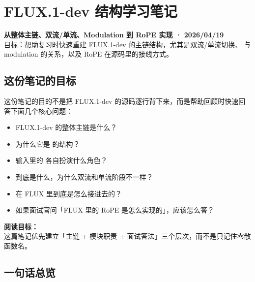 
\section{FLUX.1-dev 结构学习笔记}

\begin{conceptbox}
\textbf{从整体主链、双流/单流、Modulation 到 RoPE 实现 · 2026/04/19}\\
目标：帮助复习时快速重建 FLUX.1-dev 的主链结构，尤其是双流/单流切换、 与 modulation 的关系，以及 RoPE 在源码里的接线方式。
\end{conceptbox}

\subsection{这份笔记的目标}

这份笔记的目的不是把 FLUX.1-dev 的源码逐行背下来，而是帮助回顾时快速回答下面几个核心问题：

\begin{itemize}[leftmargin=1.5em]
  \item FLUX.1-dev 的整体主链是什么？
  \item 为什么它是  的结构？
  \item 输入里的  各自扮演什么角色？
  \item {} 到底是什么，为什么双流和单流阶段不一样？
  \item {} 在 FLUX 里到底是怎么接进去的？
  \item 如果面试官问「FLUX 里的 RoPE 是怎么实现的」，应该怎么答？
\end{itemize}

\begin{intubox}
\textbf{阅读目标：}\\
这篇笔记优先建立「主链 + 模块职责 + 面试答法」三个层次，而不是只记住零散函数名。
\end{intubox}

\subsection{一句话总览}

